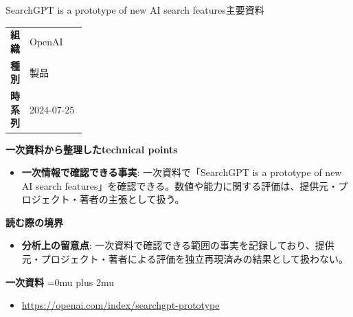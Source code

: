 \begin{technicalnote}{SearchGPT is a prototype of new AI search features}{主要資料}
\begingroup
\begin{tabularx}{\linewidth}{@{}>{\bfseries}p{0.22\linewidth}X@{}}
組織 & OpenAI \\
種別 & 製品 \\
時系列 & 2024-07-25 \\
\end{tabularx}
\smallskip
{\bfseries 一次資料から整理したtechnical points}
\begin{itemize}[leftmargin=1.5em,itemsep=0.35em]
\item \textbf{一次情報で確認できる事実}: 一次資料で「SearchGPT is a prototype of new AI search features」を確認できる。数値や能力に関する評価は、提供元・プロジェクト・著者の主張として扱う。
\end{itemize}
\begin{minipage}{\linewidth}
{\bfseries 読む際の境界}
\begin{itemize}[leftmargin=1.5em,itemsep=0.35em]
\item \textbf{分析上の留意点}: 一次資料で確認できる範囲の事実を記録しており、提供元・プロジェクト・著者による評価を独立再現済みの結果として扱わない。
\end{itemize}
\begin{samepage}
{\bfseries 一次資料}
\begingroup\sloppy
\Urlmuskip=0mu plus 2mu\relax
\begin{itemize}[leftmargin=1.5em,itemsep=0.25em]
\item {\scriptsize\url{https://openai.com/index/searchgpt-prototype}}
\end{itemize}
\endgroup
\end{samepage}
\end{minipage}
\endgroup
\end{technicalnote}
\medskip

